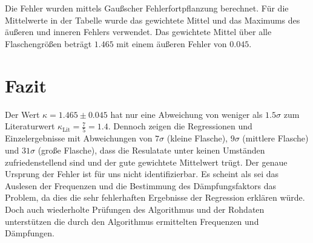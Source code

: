\documentclass[a4paper, 12pt]{scrartcl}
\begin{document}
Die Fehler wurden mittels Gaußscher Fehlerfortpflanzung berechnet. Für die Mittelwerte in der Tabelle wurde das gewichtete Mittel und das Maximums des äußeren und inneren Fehlers verwendet.
Das gewichtete Mittel über alle Flaschengrößen beträgt $1.465$ mit einem äußeren Fehler von $0.045$.

\section{Fazit}
Der Wert $\kappa = 1.465\pm 0.045$ hat nur eine Abweichung von weniger als $1.5\sigma$ zum Literaturwert $\kappa_{\text{Lit}} = \frac{7}{5} =1.4$. Dennoch zeigen die Regressionen und Einzelergebnisse mit Abweichungen von $7\sigma$ (kleine Flasche), $9\sigma$ (mittlere Flasche) und $31\sigma$ (große Flasche), dass die Resulatate unter keinen Umständen zufriedenstellend sind und der gute gewichtete Mittelwert trügt. Der genaue Ursprung der Fehler ist für uns nicht identifizierbar. Es scheint als sei das Auslesen der Frequenzen und die Bestimmung des Dämpfungsfaktors das Problem, da dies die sehr fehlerhaften Ergebnisse der Regression erklären würde. Doch auch wiederholte Prüfungen des Algorithmus und der Rohdaten unterstützen die durch den Algorithmus ermittelten Frequenzen und Dämpfungen. 

\appendix
\end{document}
